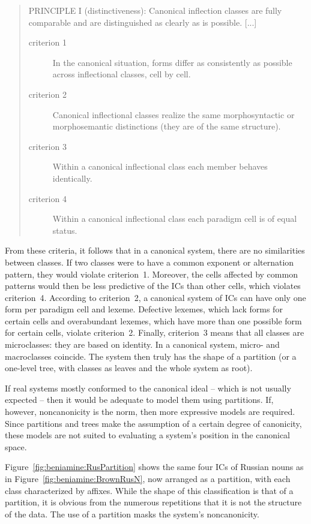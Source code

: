 \documentclass[output=paper]{langscibook}
\begin{document}
    \begin{quote}
        PRINCIPLE I (distinctiveness): Canonical inflection classes are fully comparable and are distinguished as clearly as is possible.
        [...]
        \begin{description}
            \item[criterion 1] In the canonical situation, forms differ as consistently as possible across
            inflectional classes, cell by cell.
            \item[criterion 2] Canonical inflectional classes realize the same morphosyntactic or
            morphosemantic distinctions (they are of the same structure).
            \item[criterion 3] Within a canonical inflectional class each member behaves identically.
            \item[criterion 4] Within a canonical inflectional class each paradigm cell is of equal status.
        \end{description}
    \end{quote}

    From these criteria, it follows that in a canonical system, there are no similarities between classes. If two classes were to have a common exponent or alternation pattern, they would violate criterion~1. Moreover, the cells affected by common patterns would then be less predictive of the ICs than other cells, which violates criterion~4. According to criterion~2, a canonical system of ICs can have only one form per paradigm cell and lexeme. Defective lexemes, which lack forms for certain cells and overabundant lexemes, which have more than one possible form for certain cells, violate criterion~2. Finally, criterion~3 means that all classes are microclasses: they are based on identity. In a canonical system, micro- and macroclasses coincide. The system then truly has the shape of a partition (or a one-level tree, with classes as leaves and the whole system as root).

    If real systems mostly conformed to the canonical ideal -- which is not usually expected -- then it would be adequate to model them using partitions. If, however, noncanonicity is the norm, then more expressive models are required. Since partitions and trees make the assumption of a certain degree of canonicity, these models are not suited to evaluating a system's position in the canonical space.

    Figure~\ref{fig:beniamine:RusPartition} shows the same four ICs of Russian nouns as in Figure~\ref{fig:beniamine:BrownRusN}, now arranged as a partition, with each class characterized by affixes. While the shape of this classification is that of a partition, it is obvious from the numerous repetitions that it is not the structure of the data. The use of a partition masks the system's noncanonicity.
\end{document}
